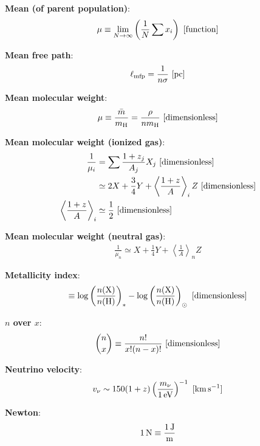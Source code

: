 \documentclass[a4paper,10pt]{article}
\begin{document}
{\noindent}\textbf{Mean (of parent population)}:
\begin{align*}
    \mu \equiv \lim_{N\rightarrow\infty}\left( \frac{1}{N} \sum x_i \right) ~ [{\rm function}]
\end{align*}

{\noindent}\textbf{Mean free path}:
\begin{align*}
    \ell_\mathrm{mfp} = \dfrac{1}{n\sigma} ~ [{\rm pc}]
\end{align*}

{\noindent}\textbf{Mean molecular weight}:
\begin{align*}
    \mu \equiv \frac{\bar{m}}{m_{\rm H}} = \frac{\rho}{nm_{\rm H}} ~ [{\rm dimensionless}]
\end{align*}

{\noindent}\textbf{Mean molecular weight (ionized gas)}:
\begin{align*}
    \frac{1}{\mu_i} &= \sum \frac{1+z_j}{A_j} X_j ~ [{\rm dimensionless}] \\
    &\simeq 2X + \frac{3}{4}Y + \left\langle\frac{1+z}{A}\right\rangle_i Z ~ [{\rm dimensionless}] \\
    \left\langle\frac{1+z}{A}\right\rangle_i &\simeq \frac{1}{2} ~ [{\rm dimensionless}]
\end{align*}

{\noindent}\textbf{Mean molecular weight (neutral gas)}:
\begin{align*}
    \frac{1}{\mu_n} \simeq X + \frac{1}{4}Y + \left\langle\frac{1}{A}\right\rangle_n Z
\end{align*}

{\noindent}\textbf{Metallicity index}:
\begin{align*}
    [\mathrm{X}/\mathrm{H}] \equiv \log\left(\frac{n(\mathrm{X})}{n(\mathrm{H})}\right)_* -\log\left(\frac{n(\mathrm{X})}{n(\mathrm{H})}\right)_\odot ~ [{\rm dimensionless}]
\end{align*}

{\noindent}\textbf{$n$ over $x$}:
\begin{align*}
    \binom{n}{x} \equiv \frac{n!}{x!(n-x)!} ~ [{\rm dimensionless}]
\end{align*}

{\noindent}\textbf{Neutrino velocity}:
\begin{align*}
    v_\nu \sim 150(1+z)\left(\frac{m_\nu}{1\,{\rm eV}}\right)^{-1} ~ [{\rm km\,s^{-1}}]
\end{align*}

{\noindent}\textbf{Newton}:
\begin{align*}
    {\rm 1\,N \equiv \frac{1\,J}{m}}
\end{align*}
\end{document}
